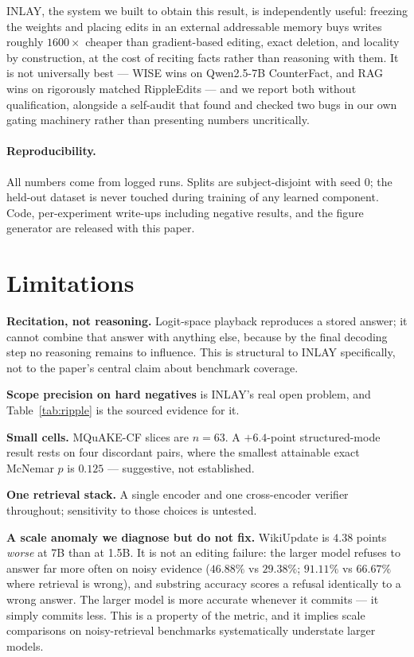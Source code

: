 \documentclass[11pt]{article}
\begin{document}
INLAY, the system we built to obtain this result, is independently useful:
freezing the weights and placing edits in an external addressable memory
buys writes roughly $1600\times$ cheaper than gradient-based editing, exact
deletion, and locality by construction, at the cost of reciting facts rather
than reasoning with them. It is not universally best --- WISE wins on
Qwen2.5-7B CounterFact, and RAG wins on rigorously matched RippleEdits ---
and we report both without qualification, alongside a self-audit that found
and checked two bugs in our own gating machinery rather than presenting
numbers uncritically.

\paragraph{Reproducibility.} All numbers come from logged runs. Splits are
subject-disjoint with seed $0$; the held-out dataset is never touched during
training of any learned component. Code, per-experiment write-ups including
negative results, and the figure generator are released with this paper.

\section*{Limitations}

\textbf{Recitation, not reasoning.} Logit-space playback reproduces a stored
answer; it cannot combine that answer with anything else, because by the
final decoding step no reasoning remains to influence. This is structural to
INLAY specifically, not to the paper's central claim about benchmark
coverage.

\textbf{Scope precision on hard negatives} is INLAY's real open problem, and
Table~\ref{tab:ripple} is the sourced evidence for it.

\textbf{Small cells.} MQuAKE-CF slices are $n{=}63$. A $+6.4$-point
structured-mode result rests on four discordant pairs, where the smallest
attainable exact McNemar $p$ is $0.125$ --- suggestive, not established.

\textbf{One retrieval stack.} A single encoder and one cross-encoder verifier
throughout; sensitivity to those choices is untested.

\textbf{A scale anomaly we diagnose but do not fix.} WikiUpdate is $4.38$
points \emph{worse} at 7B than at 1.5B. It is not an editing failure: the
larger model refuses to answer far more often on noisy evidence ($46.88\%$
vs $29.38\%$; $91.11\%$ vs $66.67\%$ where retrieval is wrong), and
substring accuracy scores a refusal identically to a wrong answer. The
larger model is more accurate whenever it commits --- it simply commits
less. This is a property of the metric, and it implies scale comparisons on
noisy-retrieval benchmarks systematically understate larger models.
\end{document}
